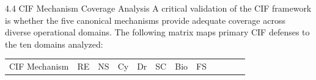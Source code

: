 \documentclass[
  ignorenonframetext,
]{beamer}
\newcounter{none} %
\begin{document}
\begin{frame}[allowframebreaks]{4.4 CIF Mechanism Coverage Analysis}
\protect{}\label{sec:mechanism_coverage}
A critical validation of the CIF framework is whether the five canonical
mechanisms provide adequate coverage across diverse operational domains.
The following matrix maps primary CIF defenses to the ten domains
analyzed:

{\def\LTcaptype{none} %
\begin{longtable}[]{@{}
  >{\raggedright\arraybackslash}p{}
  >{\centering\arraybackslash}p{}
  >{\centering\arraybackslash}p{}
  >{\centering\arraybackslash}p{}
  >{\centering\arraybackslash}p{}
  >{\centering\arraybackslash}p{}
  >{\centering\arraybackslash}p{}
  >{\centering\arraybackslash}p{}
  >{\centering\arraybackslash}p{}
  >{\centering\arraybackslash}p{}
  >{\centering\arraybackslash}p{}
  >{\centering\arraybackslash}p{}@{}}
\toprule\noalign{}
\begin{minipage}[b]{\linewidth}\raggedright
CIF Mechanism
\end{minipage} & \begin{minipage}[b]{\linewidth}\centering
RE
\end{minipage} & \begin{minipage}[b]{\linewidth}\centering
NS
\end{minipage} & \begin{minipage}[b]{\linewidth}\centering
Cy
\end{minipage} & \begin{minipage}[b]{\linewidth}\centering
Dr
\end{minipage} & \begin{minipage}[b]{\linewidth}\centering
SC
\end{minipage} & \begin{minipage}[b]{\linewidth}\centering
Bio
\end{minipage} & \begin{minipage}[b]{\linewidth}\centering
FS
\end{minipage} & \begin{minipage}[b]{\linewidth}\centering

\end{minipage}
\end{longtable}}
\end{frame}
\end{document}
